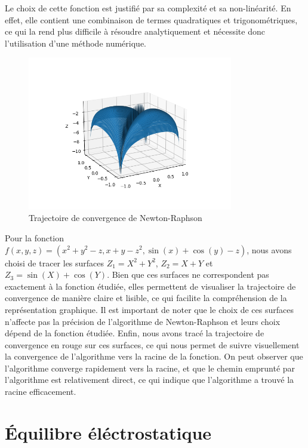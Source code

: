 \documentclass{article}
\begin{document}
Le choix de cette fonction est justifié par sa complexité et sa non-linéarité. En effet, elle contient une combinaison de termes quadratiques et trigonométriques, ce qui la rend plus difficile à résoudre analytiquement et nécessite donc l'utilisation d'une méthode numérique.


\begin{figure}[h]
    \centering
    \includegraphics[width=0.8\textwidth]{Figure_1.png}
    \caption{Trajectoire de convergence de Newton-Raphson}
    \label{fig:convergence}
\end{figure}

Pour la fonction $f(x,y,z) = (x^2 + y^2 - z, x + y - z^2, \sin(x) + \cos(y) - z)$, nous avons choisi de tracer les surfaces $Z_1 = X^2 + Y^2$, $Z_2 = X + Y$ et $Z_3 = \sin(X) + \cos(Y)$. Bien que ces surfaces ne correspondent pas exactement à la fonction étudiée, elles permettent de visualiser la trajectoire de convergence de manière claire et lisible, ce qui facilite la compréhension de la représentation graphique. Il est important de noter que le choix de ces surfaces n'affecte pas la précision de l'algorithme de Newton-Raphson et leurs choix dépend de la fonction étudiée. Enfin, nous avons tracé la trajectoire de convergence en rouge sur ces surfaces, ce qui nous permet de suivre visuellement la convergence de l'algorithme vers la racine de la fonction. On peut observer que l'algorithme converge rapidement vers la racine, et que le chemin emprunté par l'algorithme est relativement direct, ce qui indique que l'algorithme a trouvé la racine efficacement.

\section{Équilibre éléctrostatique}
\end{document}
